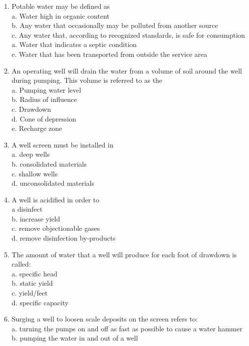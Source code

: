 \begin{enumerate}
\item Potable water may be defined as\\
a. Water high in organic content\\
b. Any water that occasionally may be polluted from another source\\
c. Any water that, according to recognized standards, is safe for consumption\\
a. Water that indicates a septic condition\\
e. Water that has been transported from outside the service area\\
\item An operating well will drain the water from a volume of soil around the well during pumping. This volume is referred to as the\\
a. Pumping water level\\
b. Radius of influence\\
c. Drawdown\\
d. Cone of depression\\
e. Recharge zone\\
\item A well screen must be installed in\\
a. deep wells\\
b. consolidated materials\\
c. shallow wells\\
d. unconsolidated materials\\
\item A well is acidified in order to\\
a disinfect\\
b. increase yield\\
c. remove objectionable gases\\
d. remove disinfection by-products\\
\item The amount of water that a well will produce for each foot of drawdown is called:\\
a. specific head\\
b. static yield\\
c. yield/feet\\
d. specific capacity\\
\item Surging a well to loosen scale deposits on the screen refers to:\\
a. turning the pumps on and off as fast as possible to cause a water hammer\\
b. pumping the water in and out of a well\\

\end{enumerate}
